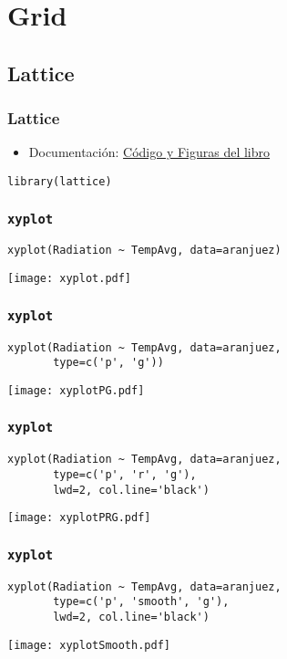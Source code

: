 \documentclass[xcolor={usenames,svgnames,dvipsnames}]{beamer}
\begin{document}
\section{Grid}
\label{sec-2}
\subsection{Lattice}
\label{sec-2-1}
\begin{frame}[fragile]
\frametitle{Lattice}
\label{sec-2-1-1}


\begin{itemize}
\item Documentación: \href{http://lmdvr.r-forge.r-project.org/figures/figures.html}{Código y Figuras del libro}
\end{itemize}


\lstset{language=R}
\begin{lstlisting}
library(lattice)
\end{lstlisting}
\end{frame}
\begin{frame}[fragile]
\frametitle{\texttt{xyplot}}
\label{sec-2-1-2}


\lstset{language=R}
\begin{lstlisting}
xyplot(Radiation ~ TempAvg, data=aranjuez)
\end{lstlisting}

\texttt{[image: xyplot.pdf]}

    
\end{frame}
\begin{frame}[fragile]
\frametitle{\texttt{xyplot}}
\label{sec-2-1-3}


\lstset{language=R}
\begin{lstlisting}
xyplot(Radiation ~ TempAvg, data=aranjuez,
       type=c('p', 'g'))
\end{lstlisting}

\texttt{[image: xyplotPG.pdf]}
\end{frame}
\begin{frame}[fragile]
\frametitle{\texttt{xyplot}}
\label{sec-2-1-4}


\lstset{language=R}
\begin{lstlisting}
xyplot(Radiation ~ TempAvg, data=aranjuez,
       type=c('p', 'r', 'g'),
       lwd=2, col.line='black')
\end{lstlisting}

\texttt{[image: xyplotPRG.pdf]}
\end{frame}
\begin{frame}[fragile]
\frametitle{\texttt{xyplot}}
\label{sec-2-1-5}


\lstset{language=R}
\begin{lstlisting}
xyplot(Radiation ~ TempAvg, data=aranjuez,
       type=c('p', 'smooth', 'g'),
       lwd=2, col.line='black')
\end{lstlisting}

\texttt{[image: xyplotSmooth.pdf]}
\end{frame}
\end{document}
